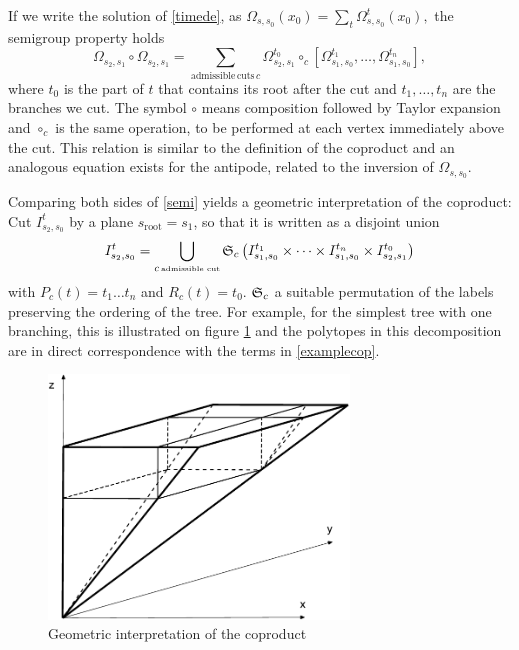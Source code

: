 \documentclass[12pt,here,feynmf]{article}
\begin{document}
If we write the solution of \eqref{timede}, as 
$
\Omega_{s, s_{0}}(x_{0})=\sum_t\Omega^{t}_{s,s_0}(x_{0}), 
$
the semigroup property holds
\begin{equation}
\Omega_{s_{2},s_{1}}\circ\Omega_{s_{2},s_{1}}=\sum_{\mathrm{admissible}\,\mathrm{cuts}\,c}
\Omega^{t_{0}}_{s_{2},s_{1}}\circ_{c}
\left[\Omega^{t_{1}}_{s_{1},s_{0}},\dots,\Omega^{t_{n}}_{s_{1},s_{0}}\right],\label{semi}
\end{equation}
where $t_{0}$ is the part of $t$ that contains its root after the cut and $t_{1},\dots,t_{n}$ are the branches we cut. The symbol $\circ$ means composition followed by Taylor expansion and $\circ_{c}$ is the same operation, to be performed at each vertex immediately above the cut. This relation is similar to the definition of the coproduct and an analogous equation exists for the antipode, related to the inversion of $\Omega_{s,s_{0}}$.


Comparing both sides of \eqref{semi} yields a geometric interpretation of the coproduct:
Cut $I_{s_{2},s_{0}}^{t}$ by a plane $s_{\mathrm{root}}=s_{1}$, so that it is written as a disjoint union
\begin{equation}
I_{s_{2},s_{0}}^{t}=\bigcup_{c\,\mbox{\tiny{admissible cut}}}{\frak
S}_{c}\left( I_{s_{1},s_{0}}^{t_{1}}\times\dots\times
I_{s_{1},s_{0}}^{t_{n}}\times I_{s_{2},s_{1}}^{t_{0}}\right)
\end{equation}
with $P_{c}(t)=t_{1}\dots t_{n}$ and $R_{c}(t)=t_{0}$. ${\frak
S}_{c}$ a suitable permutation of the labels preserving the ordering of the
tree. For example, for the simplest tree with one branching, this is illustrated on figure \ref{geometricinter} and the polytopes in this decomposition are in direct correspondence with the terms in \eqref{examplecop}. 



\begin{figure}
\begin{center}
\includegraphics[width=8cm]{_treeplex.pdf}
\caption{Geometric interpretation of the coproduct}
\label{geometricinter}
\end{center}
\end{figure}
\end{document}
